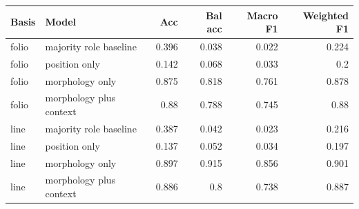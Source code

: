 {\small
\begin{tabular}{llrrrr}
\toprule
Basis & Model & Acc & Bal acc & Macro F1 & Weighted F1 \\
\midrule
folio & majority role baseline & 0.396 & 0.038 & 0.022 & 0.224 \\
folio & position only & 0.142 & 0.068 & 0.033 & 0.2 \\
folio & morphology only & 0.875 & 0.818 & 0.761 & 0.878 \\
folio & morphology plus context & 0.88 & 0.788 & 0.745 & 0.88 \\
line & majority role baseline & 0.387 & 0.042 & 0.023 & 0.216 \\
line & position only & 0.137 & 0.052 & 0.034 & 0.197 \\
line & morphology only & 0.897 & 0.915 & 0.856 & 0.901 \\
line & morphology plus context & 0.886 & 0.8 & 0.738 & 0.887 \\
\bottomrule
\end{tabular}
}
